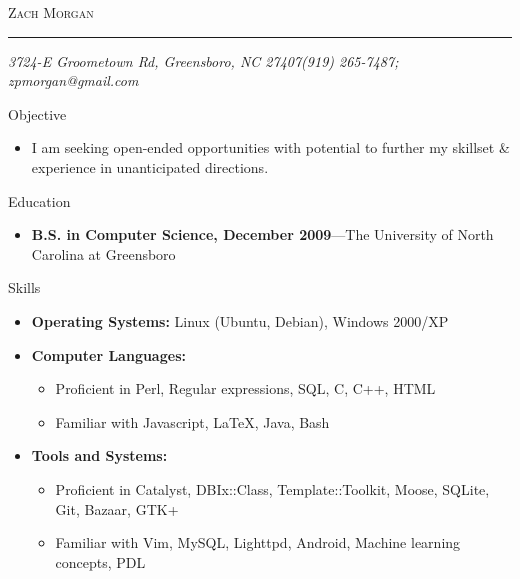 \documentclass[11pt,oneside]{article}
\makeatletter
\newcommand{\name}{Zach Morgan}
\newcommand{\addr}{3724-E Groometown Rd, Greensboro, NC 27407}
\newcommand{\phone}{(919) 265-7487}
\newcommand{\email}{zpmorgan@gmail.com}
\newcommand{\bigname}[1]{
	\begin{center}\fontfamily{phv}\selectfont\Huge\scshape#1\end{center}
}
\newenvironment{ressection}[1]{
	\vspace{2pt}
	{\fontfamily{phv}\selectfont\Large#1}
	\begin{itemize}
	\vspace{3pt}
}{
	\end{itemize}
}
\newcommand{\resitem}[1]{
	\vspace{-4pt}
	\item \begin{flushleft} #1 \end{flushleft}
}
\newcommand{\ressubitem}[1]{
	\vspace{-1pt}
	\item \begin{flushleft} #1 \end{flushleft}
}
\newcommand{\resbigitem}[3]{
	\vspace{-5pt}
	\item
	\textbf{#1}---#2 \\
	\textit{#3}
}
\newenvironment{ressubsec}[3]{
	\resbigitem{#1}{#2}{#3}
	\vspace{-2pt}
	\begin{itemize}
}{
	\end{itemize}
}
\newenvironment{reslist}[1]{
	\resitem{\textbf{#1}}
	\vspace{-5pt}
	\begin{itemize}
}{
	\end{itemize}
}
\makeatother
\begin{document}
 \selectfont

\bigname{\name}

\vspace{-8pt} \rule{\textwidth}{1pt}

\vspace{-1pt} {\small\itshape \addr \hfill \phone; \email}

\vspace{8 pt}




\begin{ressection}{Objective}

   \resitem{I am seeking open-ended opportunities with potential to further my skillset \& experience in unanticipated directions.}
	
\end{ressection}


\begin{ressection}{Education}

	\begin{ressubsec}{B.S. in Computer Science, December 2009}{The University of North Carolina at Greensboro}{}
	\end{ressubsec}

\end{ressection}


\begin{ressection}{Skills}

	\resitem{\textbf{Operating Systems:} Linux (Ubuntu, Debian), Windows 2000/XP}

	\begin{reslist}{Computer Languages:}

		\ressubitem{Proficient in Perl, Regular expressions, SQL, C, C++, HTML}

		\ressubitem{Familiar with Javascript, \LaTeX, Java, Bash}

	\end{reslist}

	\begin{reslist}{Tools and Systems:}

		\ressubitem{Proficient in Catalyst, DBIx::Class, Template::Toolkit, Moose, SQLite, Git, Bazaar, GTK+}

      \ressubitem{Familiar with Vim, MySQL, Lighttpd, Android, Machine learning concepts, PDL}

	\end{reslist}


\end{ressection}
\end{document}
